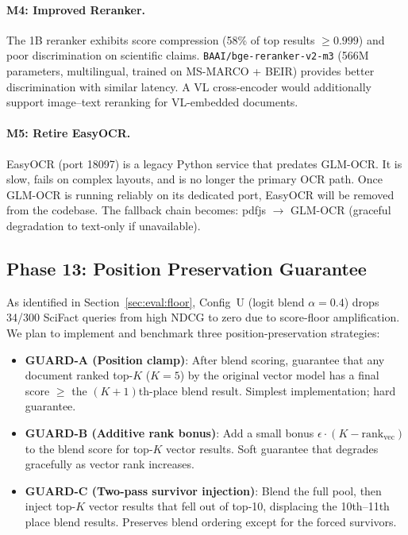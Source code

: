\documentclass[11pt]{article}
\begin{document}
\paragraph{M4: Improved Reranker.}
The 1B reranker exhibits score compression (58\% of top results $\geq 0.999$) and poor
discrimination on scientific claims. \texttt{BAAI/bge-reranker-v2-m3} (566M parameters,
multilingual, trained on MS-MARCO + BEIR) provides better discrimination with similar
latency. A VL cross-encoder would additionally support image--text reranking for
VL-embedded documents.

\paragraph{M5: Retire EasyOCR.}
EasyOCR (port 18097) is a legacy Python service that predates GLM-OCR. It is slow, fails
on complex layouts, and is no longer the primary OCR path. Once GLM-OCR is running
reliably on its dedicated port, EasyOCR will be removed from the codebase. The fallback
chain becomes: pdfjs $\to$ GLM-OCR (graceful degradation to text-only if unavailable).

\subsection{Phase 13: Position Preservation Guarantee}
\label{sec:future:phase13}

As identified in Section~\ref{sec:eval:floor}, Config~U (logit blend $\alpha=0.4$) drops
34/300 SciFact queries from high NDCG to zero due to score-floor amplification. We plan
to implement and benchmark three position-preservation strategies:

\begin{itemize}[leftmargin=2em, itemsep=3pt]
  \item \textbf{GUARD-A (Position clamp)}: After blend scoring, guarantee that any document
  ranked top-$K$ ($K=5$) by the original vector model has a final score $\geq$ the
  $(K+1)$th-place blend result. Simplest implementation; hard guarantee.
  \item \textbf{GUARD-B (Additive rank bonus)}: Add a small bonus $\epsilon \cdot (K -
  \text{rank}_{\text{vec}})$ to the blend score for top-$K$ vector results. Soft guarantee
  that degrades gracefully as vector rank increases.
  \item \textbf{GUARD-C (Two-pass survivor injection)}: Blend the full pool, then inject
  top-$K$ vector results that fell out of top-10, displacing the 10th--11th place blend
  results. Preserves blend ordering except for the forced survivors.
\end{itemize}
\end{document}
